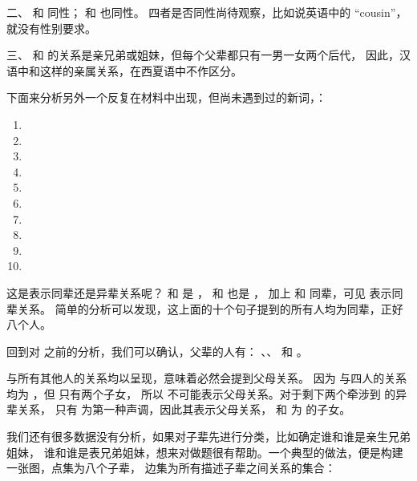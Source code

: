 二、\word{\Huuyon} 和 \word{\Hooyon} 同性；\word{\Tiiyon} 和 \word{\Teeyon} 也同性。
四者是否同性尚待观察，比如说英语中的 “cousin”，就没有性别要求。

三、\word{\Huu} 和 \word{\Hoo} 的关系是亲兄弟或姐妹，但每个父辈都只有一男一女两个后代，
因此，汉语中和这样的亲属关系，在西夏语中不作区分。

下面来分析另外一个反复在材料中出现，但尚未遇到过的新词，\word{\txCoz}：

\begin{enumerate}
\item \tangkin{\Tiiyon}{\Hoowen}{\txCoz}
\item \tangkin{\Teewen}{\Hoowen}{\txCoz}
\item \tangkin{\Teewen}{\Hooyon}{\txCoz}
\item \tangkin{\Huuyon}{\Teewen}{\txCoz}
\item \tangkin{\Teewen}{\Huuyon}{\txCoz}
\item \tangkin{\Huuyon}{\Teeyon}{\txCoz}
\item \tangkin{\Hoowen}{\Tiiwen}{\txCoz}
\item \tangkin{\Teewen}{\Huuwen}{\txCoz}
\item \tangkin{\Tiiyon}{\Hooyon}{\txCoz}
\item \tangkin{\Hoowen}{\Tiiyon}{\txCoz}
\end{enumerate}

这是表示同辈还是异辈关系呢？\word{\Huuyon} 和 \word{\Teewen} 是 \word{\txCoz}，
\word{\Teewen} 和 \word{\Hooyon} 也是 \word{\txCoz}，
加上 \word{\Huuyon} 和 \word{\Hooyon} 同辈，可见 \word{\txCoz} 表示同辈关系。
简单的分析可以发现，这上面的十个句子提到的所有人均为同辈，正好八个人。

回到对 \word{\Hoo} 之前的分析，我们可以确认，父辈的人有：
\word{\Hoo}、\word{\Huu}、\word{\Tee} 和 \word{\Tii}。

\word{\Hoo} 与所有其他人的关系均以呈现，意味着必然会提到父母关系。
因为 \word{\Hoo} 与四人的关系均为 \word{\tMoBr}，但 \word{\Hoo} 只有两个子女，
所以 \word{\tMoBr} 不可能表示父母关系。对于剩下两个牵涉到 \word{\Hoo} 的异辈关系，
只有 \word{\tangFa} 为第一种声调，因此其表示父母关系，
\word{\Hoowen} 和 \word{\Hooyon} 为 \word{\Hoo} 的子女。

我们还有很多数据没有分析，如果对子辈先进行分类，比如确定谁和谁是亲生兄弟姐妹，
谁和谁是表兄弟姐妹，想来对做题很有帮助。一个典型的做法，便是构建一张图，点集为八个子辈，
边集为所有描述子辈之间关系的集合：

